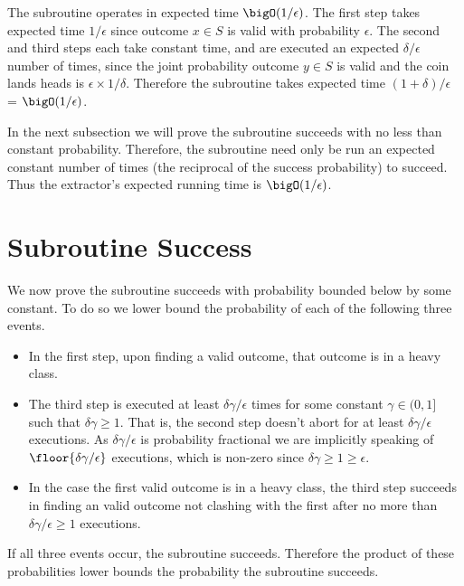 The subroutine operates in expected time $\bigO(1/\epsilon)$.
The first step takes expected time $1/\epsilon$ since outcome $x\in S$ is valid with probability $\epsilon$.
The second and third steps each take constant time, and are executed an expected $\delta/\epsilon$ number of times, since the joint probability outcome $y\in S$ is valid and the coin lands heads is $\epsilon\times1/\delta$.
Therefore the subroutine takes expected time $(1+\delta)/\epsilon$ = $\bigO(1/\epsilon)$.

In the next subsection we will prove the subroutine succeeds with no less than constant probability.
Therefore, the subroutine need only be run an expected constant number of times (the reciprocal of the success probability) to succeed.
Thus the extractor's expected running time is $\bigO(1/\epsilon)$.


\section{Subroutine Success}

We now prove the subroutine succeeds with probability bounded below by some constant.
To do so we lower bound the probability of each of the following three events.
\begin{itemize}
    \item
    In the first step, upon finding a valid outcome, that outcome is in a heavy class.

    \item
    The third step is executed at least $\delta\gamma/\epsilon$ times for some constant $\gamma\in(0,1]$ such that $\delta\gamma\geq1$.
    That is, the second step doesn't abort for at least $\delta\gamma/\epsilon$ executions.
    As $\delta\gamma/\epsilon$ is probability fractional we are implicitly speaking of $\floor{\delta\gamma/\epsilon}$ executions, which is non-zero since $\delta\gamma\geq1\geq\epsilon$.

    \item
    In the case the first valid outcome is in a heavy class, the third step succeeds in finding an valid outcome not clashing with the first after no more than $\delta\gamma/\epsilon\geq1$ executions.
\end{itemize}
If all three events occur, the subroutine succeeds.
Therefore the product of these probabilities lower bounds the probability the subroutine succeeds.


